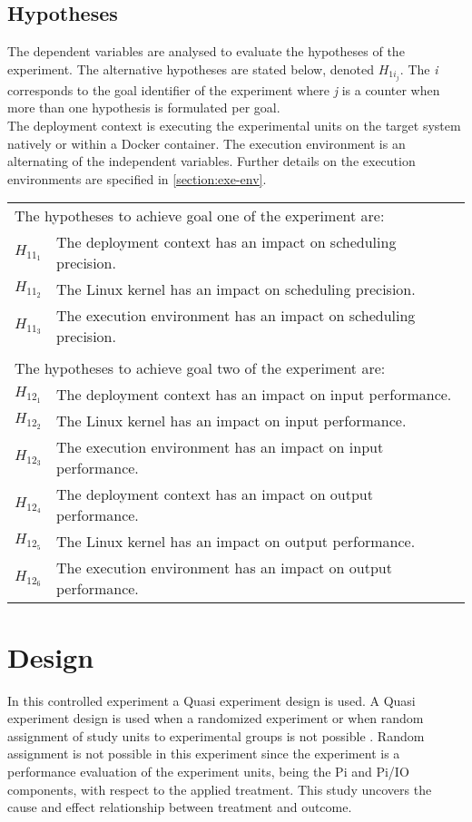 \subsection{Hypotheses}
The dependent variables are analysed to evaluate the hypotheses of the experiment. The alternative hypotheses are stated below, denoted $H_{1i_{j}}$. The \textit{i} corresponds to the goal identifier of the experiment where \textit{j} is a counter when more than one hypothesis is formulated per goal.\\

The deployment context is executing the experimental units on the target system natively or within a Docker container. The execution environment is an alternating of the independent variables. Further details on the execution environments are specified in \ref{section:exe-env}.

\begin{table}[H]
\begin{tabular}{l|l}
\multicolumn{2}{l}{The hypotheses to achieve goal one of the experiment are:} \\
$H_{11_{1}}$ & The deployment context has an impact on scheduling precision. \\
$H_{11_{2}}$ & The Linux kernel has an impact on scheduling precision. \\
$H_{11_{3}}$ & The execution environment has an impact on scheduling precision. \\          
\multicolumn{2}{l}{} \\
\multicolumn{2}{l}{The hypotheses to achieve goal two of the experiment are:} \\
$H_{12_{1}}$ & The deployment context has an impact on input performance.\\
$H_{12_{2}}$ & The Linux kernel has an impact on input performance.\\
$H_{12_{3}}$ & The execution environment has an impact on input performance.\\
$H_{12_{4}}$ & The deployment context has an impact on output performance.\\
$H_{12_{5}}$ & The Linux kernel has an impact on output performance.\\
$H_{12_{6}}$ & The execution environment has an impact on output performance.                                                          
\end{tabular}
\end{table}


\section{Design}
In this controlled experiment a Quasi experiment design is used. A Quasi experiment design is used when a randomized experiment or when random assignment of study units to experimental groups is not possible \cite{kampenes}. Random assignment is not possible in this experiment since the experiment is a performance evaluation of the experiment units, being the Pi and Pi/IO components, with respect to the applied treatment. This study uncovers the cause and effect relationship between treatment and outcome. 

